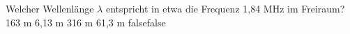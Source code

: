     {Welcher Wellenlänge $\lambda$ entspricht in etwa die Frequenz 1,84 MHz im Freiraum?}
    {163 m}
    {6,13 m}
    {316 m}
    {61,3 m}
    {false}{false}